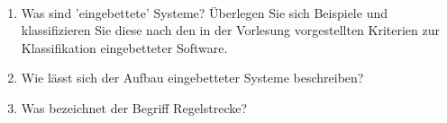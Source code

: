 \newcommand{\printpraesenzlsg}{false}
\newcommand{\printloesungen}{true}
\newcommand{\printbewertungen}{false}
\newcommand{\blattnummer}{1}



\iforiginal{}

	
\\
\begin{enumerate}
    \item Was sind ’eingebettete’ Systeme? Überlegen Sie sich Beispiele und klassifizieren Sie diese nach den in der Vorlesung vorgestellten Kriterien zur Klassifikation eingebetteter Software.
    \item Wie lässt sich der Aufbau eingebetteter Systeme beschreiben?
    \item Was bezeichnet der Begriff Regelstrecke?
\end{enumerate}

